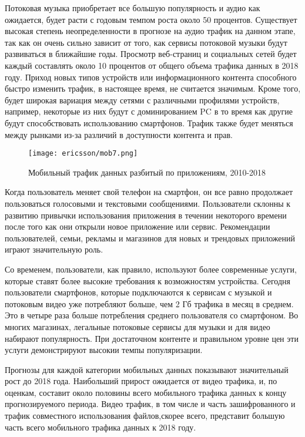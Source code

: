 Потоковая музыка приобретает все большую популярность и аудио как ожидается, будет расти с годовым темпом роста около 50 процентов. Существует высокая степень неопределенности в прогнозе на аудио трафик на данном этапе, так как он очень сильно зависит от того, как сервисы потоковой музыки будут развиваться в ближайшие годы.
Просмотр веб-страниц и социальных сетей будет каждый составлять около 10 процентов от общего объема трафика данных в 2018 году.
Приход новых типов устройств или информационного контента способного быстро изменить трафик, в настоящее время, не считается значимым. Кроме того, будет широкая вариация между сетями с различными профилями устройств, например, некоторые из них будут с доминированием PC в то время как другие будут способствовать использованию смартфонов. Трафик также будет меняться между рынками из-за различий в доступности контента и прав.

\begin{figure} [h]
  \center
\texttt{[image: ericsson/mob7.png]}
  \caption{Мобильный трафик данных разбитый по приложениям, 2010-2018 \cite{ericsson}}
  \label{img1:mob7}
\end{figure}

Когда пользователь меняет свой телефон на смартфон, он все равно продолжает пользоваться голосовыми и текстовыми сообщениями. Пользователи склонны к развитию привычки использования приложения в течении некоторого времени после того как они открыли новое приложение или сервис. Рекомендации пользователей, семьи, рекламы и магазинов для новых и трендовых приложений играют значительную роль. 

Со временем, пользователи, как правило, используют более современные услуги, которые ставят более высокие требования к возможностям устройства. Сегодня пользователи смартфонов, которые подключаются к сервисам с музыкой и потоковым видео уже потребляют больше, чем 2 Гб трафика в месяц в среднем. Это в четыре раза больше потребления среднего пользователя со смартфоном. Во многих магазинах, легальные потоковые сервисы для музыки и для видео набирают популярность. При достаточном контенте и правильном уровне цен эти услуги демонстрируют высокии темпы популяризации.

Прогнозы для каждой категории мобильных данных показывают значительный рост до 2018 года. Наибольший прирост ожидается от видео трафика, и, по оценкам, составит около половины всего мобильного трафика данных к концу прогнозируемого периода. Видео трафик, в том числе и часть зашифрованного и трафик совместного использования файлов,скорее всего, представит большую часть всего мобильного трафика данных к 2018 году.









